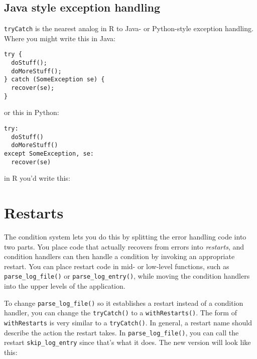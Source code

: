\subsection{Java style exception handling}

\texttt{tryCatch} is the nearest analog in R to Java- or Python-style
exception handling. Where you might write this in Java:

\begin{verbatim}
try {
  doStuff();
  doMoreStuff();
} catch (SomeException se) {
  recover(se);
}
\end{verbatim}

or this in Python:

\begin{verbatim}
try:
  doStuff()
  doMoreStuff()
except SomeException, se:
  recover(se)
\end{verbatim}

in R you'd write this:

\begin{Shaded}
\begin{Highlighting}[]
\NormalTok{(\{}
  \NormalTok{()}
  \NormalTok{()}
\NormalTok{\}, } 
\NormalTok{\})}
\end{Highlighting}
\end{Shaded}

\section{Restarts}

The condition system lets you do this by splitting the error handling
code into two parts. You place code that actually recovers from errors
into \emph{restarts}, and condition handlers can then handle a condition
by invoking an appropriate restart. You can place restart code in mid-
or low-level functions, such as \texttt{parse\_log\_file()} or
\texttt{parse\_log\_entry()}, while moving the condition handlers into
the upper levels of the application.

To change \texttt{parse\_log\_file()} so it establishes a restart
instead of a condition handler, you can change the \texttt{tryCatch()}
to a \texttt{withRestarts()}. The form of \texttt{withRestarts} is very
similar to a \texttt{tryCatch()}. In general, a restart name should
describe the action the restart takes. In \texttt{parse\_log\_file()},
you can call the restart \texttt{skip\_log\_entry} since that's what it
does. The new version will look like this:

